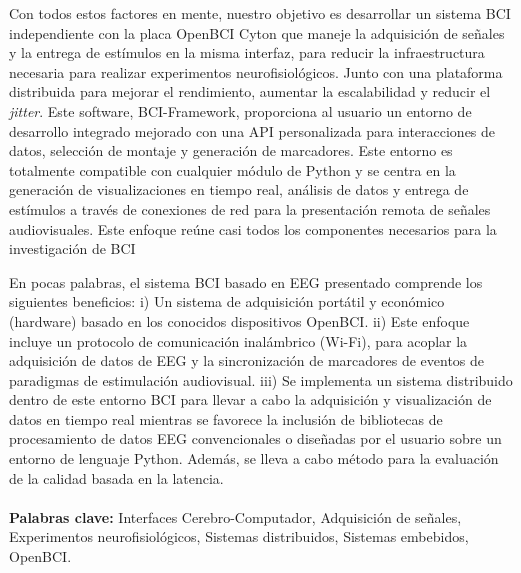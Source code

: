 Con todos estos factores en mente, nuestro objetivo es desarrollar un sistema \gls*{BCI} independiente con la placa OpenBCI Cyton que maneje la adquisición de señales y la entrega de estímulos en la misma interfaz, para reducir la infraestructura necesaria para realizar experimentos neurofisiológicos. Junto con una plataforma distribuida para mejorar el rendimiento, aumentar la escalabilidad y reducir el \textit{jitter}. Este software, BCI-Framework, proporciona al usuario un entorno de desarrollo integrado mejorado con una API personalizada para interacciones de datos, selección de montaje y generación de marcadores. Este entorno es totalmente compatible con cualquier módulo de Python y se centra en la generación de visualizaciones en tiempo real, análisis de datos y entrega de estímulos a través de conexiones de red para la presentación remota de señales audiovisuales. Este enfoque reúne casi todos los componentes necesarios para la investigación de \gls*{BCI}


En pocas palabras, el sistema \gls*{BCI} basado en EEG presentado comprende los siguientes beneficios: i) Un sistema de adquisición portátil y económico (hardware) basado en los conocidos dispositivos OpenBCI. ii) Este enfoque incluye un protocolo de comunicación inalámbrico (Wi-Fi), para acoplar la adquisición de datos de EEG y la sincronización de marcadores de eventos de paradigmas de estimulación audiovisual. iii) Se implementa un sistema distribuido dentro de este entorno \gls*{BCI} para llevar a cabo la adquisición y visualización de datos en tiempo real mientras se favorece la inclusión de bibliotecas de procesamiento de datos EEG convencionales o diseñadas por el usuario sobre un entorno de lenguaje Python. Además, se lleva a cabo método para la evaluación de la calidad basada en la latencia.\\

\\[2.0cm]

\textbf{\small Palabras clave:} Interfaces Cerebro-Computador, Adquisición de señales, Experimentos neurofisiológicos, Sistemas distribuidos, Sistemas embebidos, OpenBCI.\\